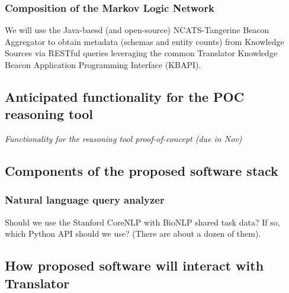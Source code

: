 \documentclass[11pt,notitlepage]{article}
\begin{document}
\subsubsection{Composition of the Markov Logic Network}
We will use the Java-baesd (and open-source) NCATS-Tangerine Beacon Aggregator
to obtain metadata (schemas and entity counts) from Knowledge Sources via
RESTful queries leveraging the common Translator Knowledge Beacon Application
Programming Interface (KBAPI).


\subsection{Anticipated functionality for the POC reasoning tool}
\textit{Functionality for the reasoning tool proof-of-concept (due in Nov)}
\subsection{Components of the proposed software stack}


\subsubsection{Natural language query analyzer}
\label{sec:nlp}
Should we use the Stanford CoreNLP with BioNLP shared task data? If so, which
Python API should we use? (There are about a dozen of them).

\subsection{How proposed software will interact with Translator}
\end{document}
